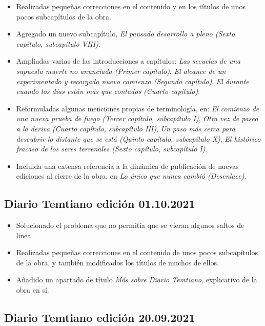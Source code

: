\documentclass[
]{book}
\begin{document}
\begin{itemize}
\item
  Realizadas pequeñas correcciones en el contenido y en los títulos de unos pocos subcapítulos de la obra.
\item
  Agregado un nuevo subcapítulo, \emph{El pausado desarrollo a pleno (Sexto capítulo, subcapítulo VIII)}.
\item
  Ampliadas varias de las introducciones a capítulos: \emph{Las secuelas de una supuesta muerte no anunciada (Primer capítulo)}, \emph{El alcance de un experimentado y recargado nuevo comienzo (Segundo capítulo)}, \emph{El durante cuando los días están más que contados (Cuarto capítulo)}.
\item
  Reformuladas algunas menciones propias de terminología, en: \emph{El comienzo de una nueva prueba de fuego (Tercer capítulo, subcapítulo I)}, \emph{Otra vez de paseo a la deriva (Cuarto capítulo, subcapítulo III)}, \emph{Un paso más cerca para descubrir lo distante que se está (Quinto capítulo, subcapítulo X)}, \emph{El histórico fracaso de los seres terrenales (Sexto capítulo, subcapítulo I)}.
\item
  Incluida una extensa referencia a la dinámica de publicación de nuevas ediciones al cierre de la obra, en \emph{Lo único que nunca cambió (Desenlace)}.
\end{itemize}

\hypertarget{diario-temtiano-ediciuxf3n-01.10.2021}{%
\subsection*{Diario Temtiano edición 01.10.2021}\label{diario-temtiano-ediciuxf3n-01.10.2021}}

\begin{itemize}
\item
  Solucionado el problema que no permitía que se vieran algunos saltos de linea.
\item
  Realizadas pequeñas correcciones en el contenido de unos pocos subcapítulos de la obra, y también modificados los títulos de muchos de ellos.
\item
  Añadido un apartado de título \emph{Más sobre Diario Temtiano}, explicativo de la obra en sí.
\end{itemize}

\hypertarget{diario-temtiano-ediciuxf3n-20.09.2021}{%
\subsection*{Diario Temtiano edición 20.09.2021}\label{diario-temtiano-ediciuxf3n-20.09.2021}}
\end{document}
